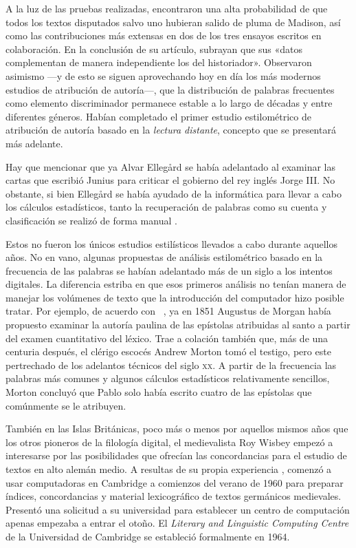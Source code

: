 A la luz de las pruebas realizadas, \citeauthor{mosteller1963} encontraron una alta probabilidad de que todos los textos disputados salvo uno hubieran salido de pluma de Madison, así como las contribuciones más extensas en dos de los tres ensayos escritos en colaboración. En la conclusión de su artículo, subrayan que sus «datos complementan de manera independiente los del historiador». Observaron asimismo —y de esto se siguen aprovechando hoy en día los más modernos estudios de atribución de autoría—, que la distribución de palabras frecuentes como elemento discriminador permanece estable a lo largo de décadas y entre diferentes géneros. Habían completado el primer estudio estilométrico de atribución de autoría basado en la \textit{lectura distante}, concepto que se presentará más adelante.

Hay que mencionar que ya Alvar Ellegård \parencite*{ellegard1962} se había adelantado al examinar las cartas que escribió Junius para criticar el gobierno del rey inglés Jorge III. No obstante, si bien Ellegård se había ayudado de la informática para llevar a cabo los cálculos estadísticos, tanto la recuperación de palabras como su cuenta y clasificación se realizó de forma manual \parencite[5]{hockey2004}.

Estos no fueron los únicos estudios estilísticos llevados a cabo durante aquellos años. No en vano, algunas propuestas de análisis estilométrico basado en la frecuencia de las palabras se habían adelantado más de un siglo a los intentos digitales. La diferencia estriba en que esos primeros análisis no tenían manera de manejar los volúmenes de texto que la introducción del computador hizo posible tratar. Por ejemplo, de acuerdo con \citeauthor{hockey2004}~\parencite*[5]{hockey2004}, ya en 1851 Augustus de Morgan había propuesto examinar la autoría paulina de las epístolas atribuidas al santo a partir del examen cuantitativo del léxico. Trae a colación \citeauthor{hockey2004} también que, más de una centuria después, el clérigo escocés Andrew Morton tomó el testigo, pero este pertrechado de los adelantos técnicos del siglo \textsc{xx}. A partir de la frecuencia las palabras más comunes y algunos cálculos estadísticos relativamente sencillos, Morton \parencite*{morton1965} concluyó que Pablo solo había escrito cuatro de las epístolas que comúnmente se le atribuyen.

También en las Islas Británicas, poco más o menos por aquellos mismos años que los otros pioneros de la filología digital, el medievalista Roy Wisbey empezó a interesarse por las posibilidades que ofrecían las concordancias para el estudio de textos en alto alemán medio. A resultas de su propia experiencia \parencite{wisbey1968}, comenzó a usar computadoras en Cambridge a comienzos del verano de 1960 para preparar índices, concordancias y material lexicográfico de textos germánicos medievales. Presentó una solicitud a su universidad para establecer un centro de computación apenas empezaba a entrar el otoño. El \textit{Literary and Linguistic Computing Centre} de la Universidad de Cambridge se estableció formalmente en 1964.

